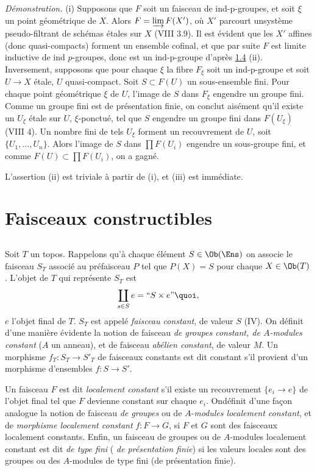 \documentclass[10pt]{../fichiers-configuration-latex/smfart}
\begin{document}
\noindent
\emph{Démonstration.}
(i) Supposons que $F$ soit un faisceau de ind-p-groupes, et soit
  $\xi$ un point géométrique de $X$. Alors $F=\varinjlim F(X')$, où
  $X'$ parcourt un\pageoriginale système pseudo-filtrant de schémas
étales sur $X$ (VIII 3.9). Il est évident que les $X'$ affines (donc
quasi-compacts) forment un ensemble cofinal, et que par suite $F$ est
limite inductive de ind $p$-groupes, donc est un ind-p-groupe d'après
\hyperref[IX.prop1.4]{1.4} (ii). Inversement, supposons que pour chaque $\xi$ la fibre
$F_{\xi}$ soit un ind-p-groupe et soit $U\rightarrow X$ étale, $U$
quasi-compact. Soit $S\subset F(U)$ un sous-ensemble fini. Pour chaque
point géométrique $\xi$ de $U$, l'image de $S$ dans $F_{\xi}$ engendre
un groupe fini. Comme un groupe fini est de présentation finie, on
conclut aisément qu'il existe un $U_{\xi}$ étale sur $U$,
$\xi$-ponctué, tel que $S$ engendre un groupe fini dans $F(U_{\xi})$
(\cf VIII 4). Un nombre fini de tels $U_{\xi}$ forment un recouvrement
de $U$, soit $\{U_1,\ldots,U_n\}$. Alors l'image de $S$ dans $\prod
F(U_i)$ engendre un sous-groupe fini, et comme $F(U)\subset \prod
F(U_i)$, on a gagné.

L'assertion (ii) est triviale à partir de (i), et (iii) est immédiate.

\section{Faisceaux constructibles}

\setcounter{subsection}{-1}
\subsection{}
Soit $T$ un topos. Rappelons qu'à chaque élément $S\in \Ob (\Ens)$ on
associe le faisceau $S_T$ associé au préfaisceau $P$ tel que $P(X)=S$
pour chaque $X\in \Ob (T)$. L'objet de $T$ qui représente $S_T$ est
$$
\coprod_{s\in S}e= ``S\times e \mbox{''}{\quoi},
$$
$e$ l'objet final de $T$. $S_T$ est appelé \emph{faisceau constant},
de valeur $S$ (IV). On définit d'une manière évidente la notion de
faisceau \emph{de groupes constant, de $A$-modules constant} ($A$ un
anneau), et de faisceau \emph{abélien constant}, de valeur $M$. Un
morphisme $f_T:S_T\rightarrow S'_T$ de faisceaux constants est dit
constant s'il provient d'un morphisme d'ensembles $f:S\rightarrow S'$.

Un faisceau $F$ est dit \emph{localement constant} s'il existe un
recouvrement $\{e_i\rightarrow e\}$ de l'objet final tel que $F$
devienne constant sur chaque $e_i$. On\pageoriginale définit d'une
façon analogue la notion de faisceau \emph{de groupes} ou de
$A$-\emph{modules localement constant}, et de \emph{morphisme
  localement constant} $f:F\rightarrow G$, si $F$ et $G$ sont des
faisceaux localement constants. Enfin, un faisceau de groupes ou de
$A$-modules localement constant est dit \emph{de type fini} (\resp
\emph{de présentation finie}) si les valeurs locales sont des groupes
ou des $A$-modules de type fini (\resp de présentation finie).
\end{document}
